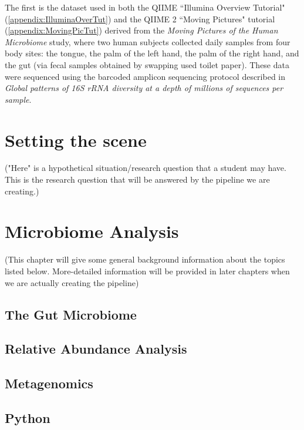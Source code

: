 The first is the dataset used in both the QIIME ``Illumina Overview Tutorial" (\ref{appendix:IlluminaOverTut})  and the QIIME 2 ``Moving Pictures" tutorial (\ref{appendix:MovingPicTut}) derived from the  \textit{Moving Pictures of the Human Microbiome} study, where two human subjects collected daily samples from four body sites: the tongue, the palm of the left hand, the palm of the right hand, and the gut (via fecal samples obtained by swapping used toilet paper). These data were sequenced using the barcoded amplicon sequencing protocol described in  \textit{Global patterns of 16S rRNA diversity at a depth of millions of sequences per sample}.  


\chapter{Setting the scene}
("Here" is a hypothetical situation/research question that a student may have. This is the research question that will be answered by the pipeline we are creating.)

\chapter{Microbiome Analysis}
(This chapter will give some general background information about the topics listed below. More-detailed information will be provided in later chapters when we are actually creating the pipeline)
\section{The Gut Microbiome}
\section{Relative Abundance Analysis}
\section{Metagenomics}
\section{Python}

